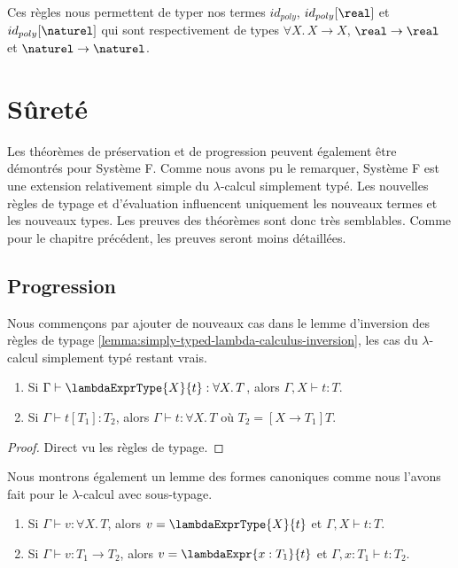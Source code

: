 Ces règles nous permettent de typer nos termes $id_{poly}$, $id_{poly}[\real]$ et
$id_{poly}[\naturel]$ qui sont respectivement de types $\forall X . \, X
\rightarrow X$, $\real \rightarrow \real$ et $\naturel \rightarrow \naturel$.

\section{Sûreté}

Les théorèmes de préservation et de progression peuvent également être démontrés
pour Système F. Comme nous avons pu le remarquer, Système F est une extension
relativement simple du $\lambda$-calcul simplement typé. Les nouvelles règles de typage
et d'évaluation influencent uniquement les nouveaux termes et les
nouveaux types. Les preuves des théorèmes sont donc très semblables. Comme pour
le chapitre précédent, les preuves seront moins détaillées.

\subsection*{Progression}

Nous commençons par ajouter de nouveaux cas dans le lemme d'inversion des règles
de typage \ref{lemma:simply-typed-lambda-calculus-inversion}, les cas du
$\lambda$-calcul simplement typé restant vrais.

\begin{lemma} 
  \begin{enumerate}
    \item Si $\Gamma \vdash \lambdaExprType{X}{t} : \forall X . \, T$, alors
      $\Gamma, X \vdash t : T$.
    \item Si $\Gamma \vdash t[T_{1}] : T_{2}$, alors $\Gamma \vdash t : \forall X .
      \, T$ où $T_{2} = [X \rightarrow T_{1}] T$.
  \end{enumerate}
\end{lemma}
  
\begin{proof}
  Direct vu les règles de typage.
\end{proof}

Nous montrons également un lemme des formes canoniques comme nous l'avons fait
pour le $\lambda$-calcul avec sous-typage.

\begin{lemma} 
  \begin{enumerate}
  \item Si $\Gamma \vdash v : \forall X . \, T$, alors $v =
    \lambdaExprType{X}{t}$ et $\Gamma, X \vdash t : T$.
  \item Si $\Gamma \vdash v : T_{1} \rightarrow T_{2}$, alors $v =
    \lambdaExpr{x : T_{1}}{t}$ et $\Gamma, x : T_{1} \vdash t : T_{2}$.
  \end{enumerate}
\end{lemma}

